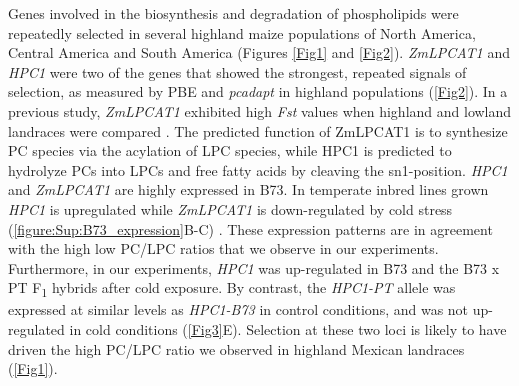 \documentclass[9pt,twocolumn,twoside,lineno]{biorxiv}
\newcommand{\hpc}{\textit{HPC1}\xspace}
\begin{document}
Genes involved in the biosynthesis and degradation of phospholipids were repeatedly selected in several highland maize populations of North America, Central America and South America (Figures \cref{Fig1} and \cref{Fig2}). 
\textit{ZmLPCAT1} and \hpc were two of the genes that showed the strongest, repeated signals of selection, as measured by PBE and \textit{pcadapt} in highland populations (\cref{Fig2}). 
In a previous study, \textit{ZmLPCAT1} exhibited high \textit{Fst} values when highland and lowland landraces were compared \cite{Takuno2015-uj}.
The predicted function of ZmLPCAT1 is to synthesize PC species via the acylation of LPC species, while HPC1 is predicted to hydrolyze PCs into LPCs and free fatty acids by cleaving the sn1-position.
\hpc and \textit{ZmLPCAT1} are highly expressed in B73. 
In temperate inbred lines grown \hpc is upregulated while \textit{ZmLPCAT1} is down-regulated by cold stress (\cref{figure:Sup:B73_expression}B-C) \cite{Waters2017-nat}.
These expression patterns are in agreement with the high low PC/LPC ratios that we observe in our experiments. 
Furthermore, in our experiments, \hpc was up-regulated in B73 and the B73 x PT F\textsubscript{1} hybrids after cold exposure. 
By contrast, the \textit{HPC1-PT} allele was expressed at similar levels as \textit{HPC1-B73} in control conditions, and was not up-regulated in cold conditions (\cref{Fig3}E).
Selection at these two loci is likely to have driven the high PC/LPC ratio we observed in highland Mexican landraces (\cref{Fig1}). 
\end{document}
